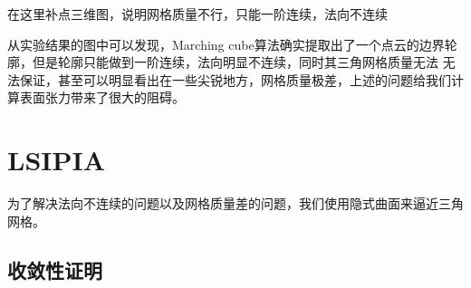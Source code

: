 \textsf{在这里补点三维图，说明网格质量不行，只能一阶连续，法向不连续}


从实验结果的图中可以发现，Marching cube算法确实提取出了一个点云的边界轮廓，但是轮廓只能做到一阶连续，法向明显不连续，同时其三角网格质量无法
无法保证，甚至可以明显看出在一些尖锐地方，网格质量极差，上述的问题给我们计算表面张力带来了很大的阻碍。

\section{LSIPIA}
为了解决法向不连续的问题以及网格质量差的问题，我们使用隐式曲面来逼近三角网格。

\subsection{收敛性证明}